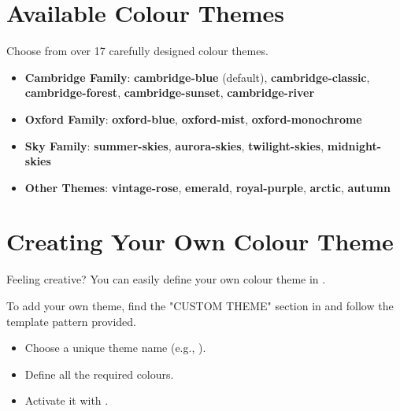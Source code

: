 \documentclass[a4paper,11pt]{report}
\begin{document}
\section{Available Colour Themes}
Choose from over 17 carefully designed colour themes.
\begin{itemize}
    \item \textbf{Cambridge Family}: \textbf{\textcolor{showcasecambridgeblue}{cambridge-blue}} (default), \textbf{\textcolor{showcasecambridgeclassic}{cambridge-classic}}, \textbf{\textcolor{showcasecambridgeforest}{cambridge-forest}}, \textbf{\textcolor{showcasecambridgesunset}{cambridge-sunset}}, \textbf{\textcolor{showcasecambridgeriver}{cambridge-river}}
    \item \textbf{Oxford Family}: \textbf{\textcolor{showcaseoxfordblue}{oxford-blue}}, \textbf{\textcolor{showcaseoxfordmist}{oxford-mist}}, \textbf{\textcolor{showcaseoxfordmonochrome}{oxford-monochrome}}
    \item \textbf{Sky Family}: \textbf{\textcolor{showcasesummerskies}{summer-skies}}, \textbf{\textcolor{showcaseauroraskies}{aurora-skies}}, \textbf{\textcolor{showcasetwilightskies}{twilight-skies}}, \textbf{\textcolor{showcasemidnightskies}{midnight-skies}}
    \item \textbf{Other Themes}: \textbf{\textcolor{showcasevintagerose}{vintage-rose}}, \textbf{\textcolor{showcaseemerald}{emerald}}, \textbf{\textcolor{showcaseroyalpurple}{royal-purple}}, \textbf{\textcolor{showcasearctic}{arctic}}, \textbf{\textcolor{showcaseautumn}{autumn}}
\end{itemize}

\section{Creating Your Own Colour Theme}
Feeling creative? You can easily define your own colour theme in .

\begin{notetbox}
    To add your own theme, find the "CUSTOM THEME" section in  and follow the template pattern provided.
    \begin{itemize}
        \item Choose a unique theme name (e.g., ).
        \item Define all the required colours.
        \item Activate it with .
    \end{itemize}
\end{notetbox}
\end{document}
